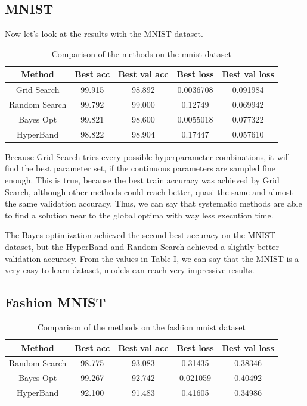 \documentclass[conference]{IEEEtran}
\begin{document}
\subsection{MNIST}
Now let's look at the results with the MNIST dataset.
\begin{table}[htbp]
	\footnotesize
	\renewcommand{\arraystretch}{1.0} %
\begin{center}
\begin{tabular}{|c|c|c|c|c|} \hline
	Method & Best acc & Best val acc & Best loss & Best val loss \\ \hline
	Grid Search & 99.915 & 98.892 & 0.0036708 & 0.091984 \\ \hline
	Random Search & 99.792 & 99.000 & 0.12749 & 0.069942 \\ \hline
	Bayes Opt & 99.821 & 98.600 & 0.0055018 & 0.077322 \\ \hline
	HyperBand & 98.822 & 98.904 & 0.17447 & 0.057610 \\ \hline
	\end{tabular}
	\label{tab:results_mnist}
\end{center}
	\caption{Comparison of the methods on the mnist dataset}
\end{table}

Because Grid Search tries every possible hyperparameter combinations, it will find the best parameter set, if the continuous parameters are sampled fine enough. This is true, because the best train accuracy was achieved by Grid Search, although other methods could reach better, quasi the same and almost the same validation accuracy. Thus, we can say that systematic methods are able to find a solution near to the global optima with way less execution time.

The Bayes optimization achieved the second best accuracy on the MNIST dataset, but the HyperBand and Random Search achieved a slightly better validation accuracy. From the values in Table I, we can say that the MNIST is a very-easy-to-learn dataset, models can reach very impressive results.

\subsection{Fashion MNIST}
\begin{table}[htbp]
	\footnotesize
	\renewcommand{\arraystretch}{1.0} %
\begin{center}
\begin{tabular}{|c|c|c|c|c|} \hline
	Method & Best acc & Best val acc & Best loss & Best val loss \\ \hline
	Random Search & 98.775 & 93.083 & 0.31435 & 0.38346 \\ \hline
	Bayes Opt & 99.267 & 92.742 & 0.021059 & 0.40492 \\ \hline
	HyperBand & 92.100 & 91.483 & 0.41605 & 0.34986 \\ \hline
	\end{tabular}
	\label{tab:results_fashionmnist}
\end{center}
	\caption{Comparison of the methods on the fashion mnist dataset}
\end{table}\vspace{-0.3cm}
\end{document}
